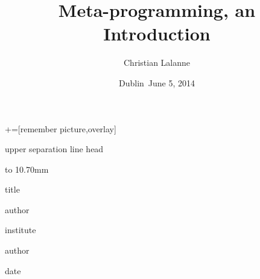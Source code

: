 \documentclass[notes=hide,xcolor=svgnames,professionalfonts,lualatex]{beamer}
\title[Metaprogramming, an Introduction]
{Meta-programming, an Introduction}
\author[Christian Lalanne \emph{et. al}] %
{\textcolor{CherryRed}{Christian Lalanne}}
\institute[ICHEC] %
{
     \emph{Irish Centre for High-End Computing}    
  }
\date[June 5, 2014] %
{Dublin\ June 5, 2014}
\begin{document}
+=[remember picture,overlay]

\everymath{\displaystyle}
\begin{frame}[plain]
 \begin{beamercolorbox}[wd=1.0\paperwidth,colsep=2.5pt]{upper separation line head}
 \end{beamercolorbox}    
\begin{beamercolorbox}[wd=1.0\paperwidth,colsep=2.5pt]{}
\vbox to 10.70mm {%
 \vfill {\hskip0mm } \vfil%
}%
\hskip-1.75mm
\end{beamercolorbox}

\begin{center}
\begin{beamercolorbox}[wd=1.0\paperwidth,center,ht=13.0mm]{title}
  \begin{minipage}{0.65\paperwidth}
   \begin{center}
    \inserttitle
    \end{center}
  \end{minipage}
\end{beamercolorbox}

\begin{beamercolorbox}[wd=\paperwidth,center,ht=11mm]{author}
   \insertauthor
\end{beamercolorbox}

\begin{beamercolorbox}[wd=\paperwidth,center,ht=7mm]{institute}
    \insertinstitute
\end{beamercolorbox}

\begin{beamercolorbox}[wd=\paperwidth,center,ht=9mm]{author}
\end{beamercolorbox}

\begin{beamercolorbox}[wd=\paperwidth,center,ht=13mm]{date}
  \insertdate
\end{beamercolorbox}

\end{center}
\addtocounter{framenumber}{-1}
\end{frame}
\end{document}
